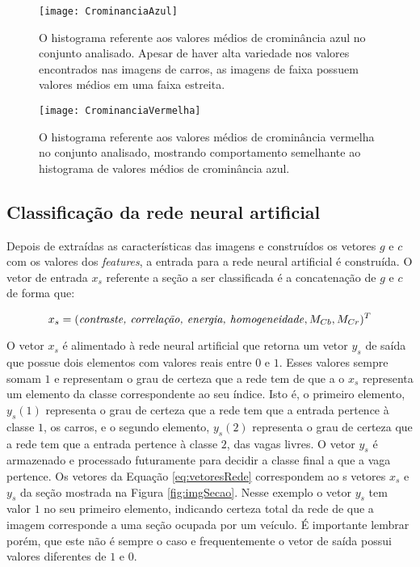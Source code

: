 \begin{figure}
	\centering
	\texttt{[image: CrominanciaAzul]}
	\caption{O histograma referente aos valores médios de crominância azul no conjunto analisado. Apesar de haver alta variedade nos valores encontrados nas imagens de carros, as imagens de faixa possuem valores médios em uma faixa estreita. }
		\label{fig:histCb}
	\centering
\end{figure}

\begin{figure}
	\centering
	\texttt{[image: CrominanciaVermelha]}
	\caption{O histograma referente aos valores médios de crominância vermelha no conjunto analisado, mostrando comportamento semelhante ao histograma de valores médios de crominância azul. }
		\label{fig:histCr}
	\centering
\end{figure}


\subsection{Classificação da rede neural artificial}

Depois de extraídas as características das imagens e construídos os vetores $g$ e $c$ com os valores dos \textit{features}, a entrada para a rede neural artificial é construída. O vetor de entrada $x_s$ referente a seção a ser classificada é a concatenação de $g$ e $c$ de forma que:

\begin{equation}
	x_s = (\text{\textit{contraste, correlação, energia, homogeneidade}}, M_{Cb}, M_{Cr})^T
\end{equation}

O vetor $x_s$ é alimentado à rede neural artificial que retorna um vetor $y_s$ de saída que possue dois elementos com valores reais entre $0$ e $1$. Esses valores sempre somam $1$ e representam o grau de certeza que a rede tem de que a o $x_s$ representa um elemento da classe correspondente ao seu índice. Isto é, o primeiro elemento, $y_s(1)$ representa o grau de certeza que a rede tem que a entrada pertence à classe $1$, os carros, e o segundo elemento, $y_s(2)$ representa o grau de certeza que a rede tem que a entrada pertence à classe $2$, das vagas livres. O vetor $y_s$ é armazenado e processado futuramente para decidir a classe final a que a vaga pertence. Os vetores da Equação \ref{eq:vetoresRede} correspondem ao s vetores $x_s$ e $y_s$ da seção mostrada na Figura \ref{fig:imgSecao}. Nesse exemplo o vetor $y_s$ tem valor $1$ no seu primeiro elemento, indicando certeza total da rede de que a imagem corresponde a uma seção ocupada por um veículo. É importante lembrar porém, que este não é sempre o caso e frequentemente o vetor de saída possui valores diferentes de $1$ e $0$.

